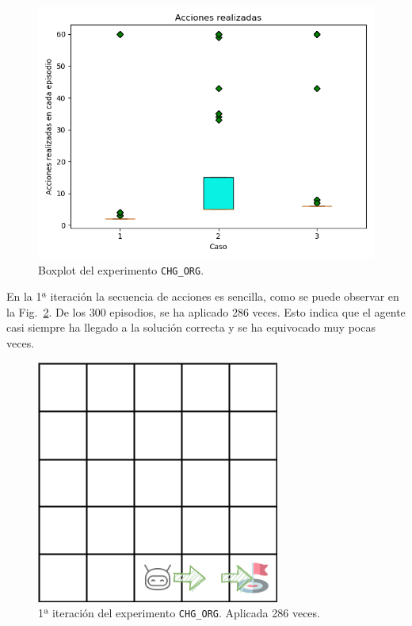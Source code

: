 \begin{figure}
    \centering
    \includegraphics[scale=0.4]{cap5_experimentacion/images/CHANGE_ORIGIN-20-09_00-42-50_boxplot.png}
    \caption{Boxplot del experimento \texttt{CHG\_ORG}.}
    \label{fig:CHANGE_ORIGIN-20-09_00-42-50_boxplot}
\end{figure}

En la 1ª iteración la secuencia de acciones es sencilla, como se puede observar en la  Fig.~\ref{fig:dim5_CHANGE_ORIGIN-20-09_00-42-50}. De los 300 episodios, se ha aplicado 286 veces. Esto indica que el agente casi siempre ha llegado a la solución correcta y se ha equivocado muy pocas veces.\\

\begin{figure}
    \centering
    \includegraphics[scale=0.4]{cap5_experimentacion/images/dim5_CHANGE_ORIGIN-20-09_00-42-50.png}
    \caption{1ª iteración del experimento \texttt{CHG\_ORG}. Aplicada 286 veces.}
    \label{fig:dim5_CHANGE_ORIGIN-20-09_00-42-50}
\end{figure}


